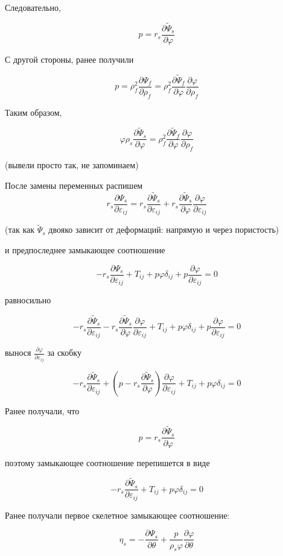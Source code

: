 \documentclass[main.tex]{subfiles}
\begin{document}
Следовательно,

$$p=r_s\frac{\partial\tilde{\Psi}_s}{\partial\varphi}$$

С другой стороны, ранее получили

$$p=\rho_f^2\frac{\partial\Psi_f}{\partial\rho_f}=\rho_f^2\frac{\partial\tilde{\Psi}_f}{\partial\varphi}\frac{\partial\varphi}{\partial\rho_f}$$

Таким образом,

$$\varphi\rho_s\frac{\partial\tilde{\Psi}_s}{\partial\varphi}=\rho_f^2\frac{\partial\tilde{\Psi}_f}{\partial\varphi}\frac{\partial\varphi}{\partial\rho_f}$$

(вывели просто так, не запоминаем)

После замены переменных распишем $$r_s\frac{\partial\Psi_s}{\partial\varepsilon_{ij}}=r_s\frac{\partial\tilde{\Psi}_s}{\partial\varepsilon_{ij}}+r_s\frac{\partial\tilde{\Psi}_s}{\partial\varphi}\frac{\partial\varphi}{\partial\varepsilon_{ij}}$$

(так как $\tilde{\Psi}_s$ двояко зависит от деформаций: напрямую и через пористость)

и предпоследнее замыкающее соотношение

$$-r_s\frac{\partial\Psi_s}{\partial\varepsilon_{ij}}+T_{ij}+p\varphi\delta_{ij}+p\frac{\partial\varphi}{\partial\varepsilon_{ij}}=0$$

равносильно

$$-r_s\frac{\partial\tilde{\Psi}_s}{\partial\varepsilon_{ij}}-r_s\frac{\partial\tilde{\Psi}_s}{\partial\varphi}\frac{\partial\varphi}{\partial\varepsilon_{ij}}+T_{ij}+p\varphi\delta_{ij}+p\frac{\partial\varphi}{\partial\varepsilon_{ij}}=0$$

вынося $\displaystyle{}\frac{\partial\varphi}{\partial\varepsilon_{ij}}$ за скобку

$$-r_s\frac{\partial\tilde{\Psi}_s}{\partial\varepsilon_{ij}}+\left(p-r_s\frac{\partial\tilde{\Psi}_s}{\partial\varphi}\right)\frac{\partial\varphi}{\partial\varepsilon_{ij}}+T_{ij}+p\varphi\delta_{ij}=0$$

Ранее получали, что

$$p=r_s\frac{\partial\tilde{\Psi}_s}{\partial\varphi}$$

поэтому замыкающее соотношение перепишется в виде

$$-r_s\frac{\partial\tilde{\Psi}_s}{\partial\varepsilon_{ij}}+T_{ij}+p\varphi\delta_{ij}=0$$

Ранее получали первое скелетное замыкающее соотношение:

$$\eta_s=-\frac{\partial\Psi_s}{\partial\theta}+\frac{p}{\rho_s\varphi}\frac{\partial\varphi}{\partial\theta}$$
\end{document}
